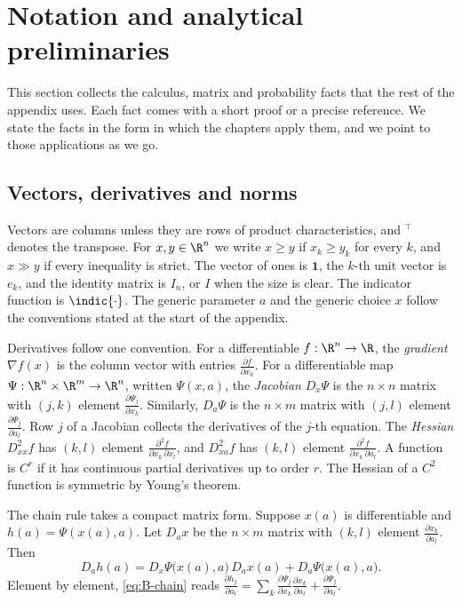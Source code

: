 \section{Notation and analytical preliminaries}\label{sec:B-prelim}

This section collects the calculus, matrix and probability facts that the rest of the appendix uses. Each fact
comes with a short proof or a precise reference. We state the facts in the form in which the chapters apply
them, and we point to those applications as we go.

\subsection{Vectors, derivatives and norms}\label{sec:B-notation}

Vectors are columns unless they are rows of product characteristics, and $^\top$ denotes the transpose. For
$x, y \in \R^n$ we write $x \geq y$ if $x_k \geq y_k$ for every $k$, and $x \gg y$ if every inequality is strict.
The vector of ones is $\mathbf{1}$, the $k$-th unit vector is $e_k$, and the identity matrix is $I_n$, or $I$ when
the size is clear. The indicator function is $\indic\{\cdot\}$. The generic parameter $a$ and the generic choice $x$
follow the conventions stated at the start of the appendix.

Derivatives follow one convention. For a differentiable $f : \R^n \to \R$, the \emph{gradient} $\nabla f(x)$ is
the column vector with entries $\frac{\partial f}{\partial x_k}$. For a differentiable map
$\Psi : \R^n \times \R^m \to \R^n$, written $\Psi(x, a)$, the \emph{Jacobian} $D_x\Psi$ is the $n \times n$ matrix
with $(j, k)$ element $\frac{\partial \Psi_j}{\partial x_k}$. Similarly, $D_a\Psi$ is the $n \times m$ matrix with
$(j, l)$ element $\frac{\partial \Psi_j}{\partial a_l}$. Row $j$ of a Jacobian collects the derivatives of the
$j$-th equation. The \emph{Hessian} $D^2_{xx}f$ has $(k, l)$ element $\frac{\partial^2 f}{\partial x_k\,\partial x_l}$,
and $D^2_{xa}f$ has $(k, l)$ element $\frac{\partial^2 f}{\partial x_k\,\partial a_l}$. A function is $C^r$ if it has
continuous partial derivatives up to order $r$. The Hessian of a $C^2$ function is symmetric by Young's theorem.

The chain rule takes a compact matrix form. Suppose $x(a)$ is differentiable and $h(a) = \Psi(x(a), a)$. Let
$D_a x$ be the $n \times m$ matrix with $(k, l)$ element $\frac{\partial x_k}{\partial a_l}$. Then
\begin{equation}\label{eq:B-chain}
D_a h(a) = D_x\Psi\big(x(a), a\big)\, D_a x(a) + D_a\Psi\big(x(a), a\big).
\end{equation}
Element by element, \eqref{eq:B-chain} reads
$\frac{\partial h_j}{\partial a_l} = \sum_{k} \frac{\partial \Psi_j}{\partial x_k}\frac{\partial x_k}{\partial a_l} + \frac{\partial \Psi_j}{\partial a_l}$.

